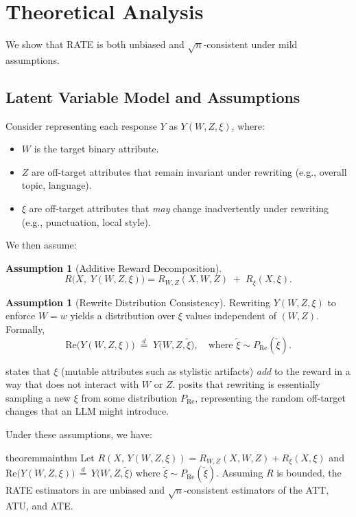 \documentclass{article}
\theoremstyle{definition}
\newtheorem{assumption}[theorem]{Assumption}
\begin{document}
\section{Theoretical Analysis}
\label{sec:theory}

We show that RATE is both unbiased and $\sqrt{n}$-consistent under mild assumptions.

\subsection{Latent Variable Model and Assumptions}

Consider representing each response $Y$ as $Y(W, Z, \xi)$, where:
\begin{itemize}
    \item $W$ is the target binary attribute.
    \item $Z$ are off-target attributes that remain invariant under rewriting (e.g., overall topic, language).
    \item $\xi$ are off-target attributes that \emph{may} change inadvertently under rewriting (e.g., punctuation, local style).
\end{itemize}
We then assume:

\begin{assumption}[Additive Reward Decomposition]
\label{assump:additive}
\[
R\bigl(X,\;Y(W,Z,\xi)\bigr) = R_{W,Z}(X,W,Z) \;+\; R_{\xi}(X,\xi).
\]
\end{assumption}
\begin{assumption}[Rewrite Distribution Consistency]
\label{assump:rewrite_dist}
Rewriting $Y(W,Z,\xi)$ to enforce $W=w$ yields a distribution over $\xi$ values independent of $(W,Z)$. Formally,
\[
\text{Re}\bigl(Y(W,Z,\xi)\bigr) \;\stackrel{d}{=}\; Y\bigl(W,Z,\tilde{\xi}\bigr),
\quad\text{where } \tilde{\xi} \sim P_{\mathrm{Re}}(\tilde{\xi}).
\]
\end{assumption}
\noindent
{} states that $\xi$ (mutable attributes such as stylistic artifacts) \emph{add} to the reward in a way that does not interact with $W$ or $Z$.  posits that rewriting is essentially sampling a new $\xi$ from some distribution $P_{\mathrm{Re}}$, representing the random off-target changes that an LLM might introduce.

Under these assumptions, we have:

\begin{restatable}{theorem}{mainthm}
\label{thm:mainthm}
Let $R(X,\,Y(W,Z,\xi)) = R_{W,Z}(X,W,Z) + R_{\xi}(X,\xi)$ and
\(
\text{Re}\bigl(Y(W,Z,\xi)\bigr) \,\stackrel{d}{=}\, Y\bigl(W,Z,\tilde{\xi}\bigr)
\)
where
\(
\tilde{\xi} \sim P_{\mathrm{Re}}(\tilde{\xi})
\).
Assuming $R$ is bounded, the RATE estimators in  are unbiased and $\sqrt{n}$-consistent estimators of the ATT, ATU, and ATE.
\end{restatable}
\end{document}
